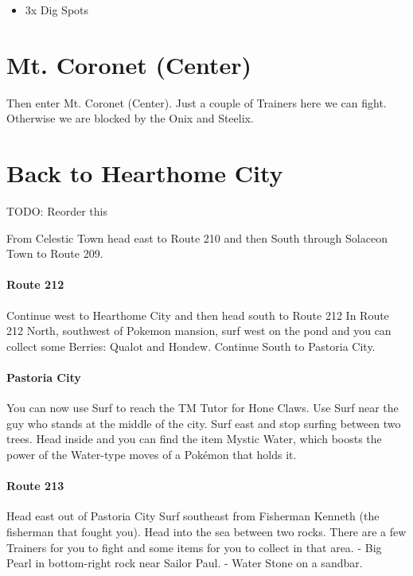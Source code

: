 \documentclass[11pt]{article}
\begin{document}
\begin{itemize}
    \item 3x Dig Spots
\end{itemize}

% 

\section{Mt. Coronet (Center)}\label{sec:mt.-coronet-(center)}
Then enter Mt. Coronet (Center).
Just a couple of Trainers here we can fight.
Otherwise we are blocked by the Onix and Steelix.



\section{Back to Hearthome City}\label{sec:back-to-hearthome-city}
TODO: Reorder this

From Celestic Town head east to Route 210 and then South through
Solaceon Town to Route 209.

\paragraph{Route 212}
Continue west to Hearthome City and then head south to Route 212
In Route 212 North, southwest of Pokemon mansion, surf west on the pond and
you can collect some Berries: Qualot and Hondew.
Continue South to Pastoria City.

\paragraph{Pastoria City}
You can now use Surf to reach the TM Tutor for Hone Claws.
Use Surf near the guy who stands at the middle of the city.
Surf east and stop surfing between two trees.
Head inside and you can find the item Mystic Water,
which boosts the power of the Water-type moves of a Pokémon that holds it.

\paragraph{Route 213}
Head east out of Pastoria City
Surf southeast from Fisherman Kenneth (the fisherman that fought you).
Head into the sea between two rocks.
There are a few Trainers for you to fight and some items for you to collect in that area.
- Big Pearl in bottom-right rock near Sailor Paul.
- Water Stone on a sandbar.
\end{document}
